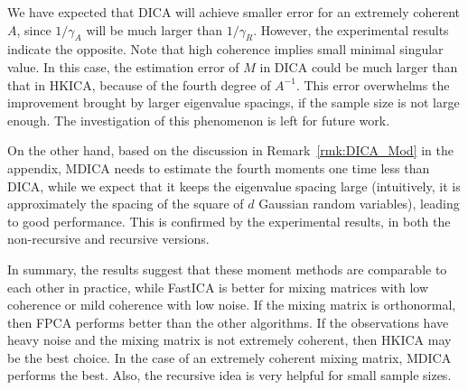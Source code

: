\documentclass[twoside,11pt]{article}
\begin{document}
We have expected that DICA will achieve smaller error for an extremely coherent $A$, since $1/\gamma_A$ will be much larger than $1/\gamma_R$. 
However, the experimental results indicate the opposite. 
Note that high coherence implies small minimal singular value.
In this case, the estimation error of $M$ in DICA could be much larger than that in HKICA, because of the fourth degree of $A^{-1}$.
This error overwhelms the improvement brought by larger eigenvalue
spacings, if the sample size is not large enough.
The investigation of this phenomenon is left for future work.

On the other hand, based on the discussion in Remark~\ref{rmk:DICA_Mod} in the appendix, 
MDICA needs to estimate the fourth moments one time less than
DICA, while we expect that it keeps the eigenvalue spacing large
(intuitively, it is approximately the spacing of the square of $d$ Gaussian random variables), leading to good performance.
This is confirmed by the experimental results, in both the non-recursive and recursive versions.

In summary, the results suggest that these moment methods are comparable to each other in practice,
while FastICA  is better for mixing matrices with low coherence or mild coherence with low noise.
If the mixing matrix is orthonormal, then FPCA performs better than
the other algorithms.
If the observations have heavy noise and the mixing matrix is not extremely coherent, then HKICA may be the best choice.
In the case of an extremely coherent mixing matrix, MDICA performs the
best. Also, the recursive idea is very helpful for small sample sizes.





\newpage 

%


\end{document}

